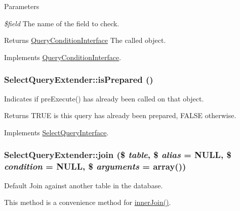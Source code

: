 \begin{DoxyParams}{Parameters}
\item[{\em \$field}]The name of the field to check.\end{DoxyParams}
\begin{DoxyReturn}{Returns}
\hyperlink{interfaceQueryConditionInterface}{QueryConditionInterface} The called object. 
\end{DoxyReturn}


Implements \hyperlink{interfaceQueryConditionInterface_a2978b536a3fe62b21e940366c9cb5923}{QueryConditionInterface}.\hypertarget{classSelectQueryExtender_a693e855f00c67fe6281c64cf0339c8ee}{
\subsubsection[{isPrepared}]{\setlength{\rightskip}{0pt plus 5cm}SelectQueryExtender::isPrepared ()}}
\label{classSelectQueryExtender_a693e855f00c67fe6281c64cf0339c8ee}
Indicates if preExecute() has already been called on that object.

\begin{DoxyReturn}{Returns}
TRUE is this query has already been prepared, FALSE otherwise. 
\end{DoxyReturn}


Implements \hyperlink{interfaceSelectQueryInterface_a04f6707fd382218aef1443a9facbc9f2}{SelectQueryInterface}.\hypertarget{classSelectQueryExtender_a6b9998d4e438ab3edc2867e32a5c120c}{
\subsubsection[{join}]{\setlength{\rightskip}{0pt plus 5cm}SelectQueryExtender::join (\$ {\em table}, \/  \$ {\em alias} = {\ttfamily NULL}, \/  \$ {\em condition} = {\ttfamily NULL}, \/  \$ {\em arguments} = {\ttfamily array()})}}
\label{classSelectQueryExtender_a6b9998d4e438ab3edc2867e32a5c120c}
Default Join against another table in the database.

This method is a convenience method for \hyperlink{classSelectQueryExtender_a4c37ec31ec8dce6287cb5d211886b23e}{innerJoin()}.


